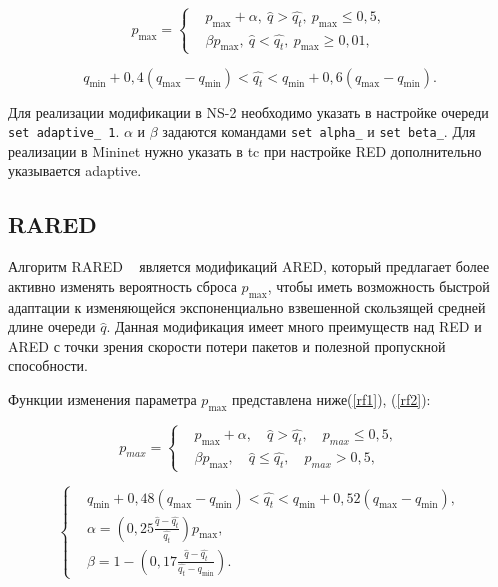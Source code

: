 \begin{equation}
\label{ad1}
p_{\max} = \left\{
  \begin{aligned}
    & p_{\max}+\alpha, \ \hat{q}>\hat{q_{t}}, \ p_{\max} \leqslant 0,5, \\
    & \beta p_{\max}, \ \hat{q}<\hat{q_{t}}, \ p_{\max} \geqslant 0,01, 
  \end{aligned}
\right.
\end{equation}

\begin{equation}
\label{ad2}
q_{\min}+0,4(q_{\max}-q_{\min}) < \hat{q_t} < q_{\min}+0,6\left(q_{\max}-q_{\min}\right).
\end{equation}


Для реализации модификации в NS-2 необходимо указать в
настройке очереди \verb|set adaptive_ 1|. $\alpha$ и $\beta$ задаются командами \verb|set alpha_| и \verb|set beta_|.     
Для реализации в Mininet нужно указать в tc при настройке RED дополнительно указывается adaptive.


\subsection{RARED}

Алгоритм RARED ~\cite{RARED} является модификаций ARED, который предлагает более активно изменять вероятность сброса $p_{\max}$,
чтобы иметь возможность быстрой адаптации к изменяющейся
экспоненциально взвешенной скользящей средней длине очереди $\hat{q}$. Данная модификация имеет много преимуществ 
над RED и ARED с точки зрения скорости потери пакетов и полезной пропускной способности. 

Функции изменения параметра $p_{\max}$ представлена ниже(\eqref{rf1}), (\eqref{rf2}):

\begin{equation}
\label{rf1}
p_{max} = \left\{
  \begin{aligned}
& p_{\max}+\alpha, \quad  \hat{q}>\hat{q_{t}}, \quad p_{max} \leqslant 0,5, \\
& \beta p_{\max}, \quad \hat{q}\leqslant\hat{q_{t}}, \quad p_{max} > 0,5,
  \end{aligned}
\right.
\end{equation}

\begin{equation}
\label{rf2}
\left\{
  \begin{aligned}
    & q_{\min}+0,48\left(q_{\max}-q_{\min}\right) < \hat{q_t} < q_{\min}+0,52\left(q_{\max}-q_{\min}\right), \\
    & \alpha=\left(0,25\frac{\hat{q}-\hat{q_t}}{\hat{q_t}} \right)p_{\max}, \\ 
    & \beta=1-\left(0,17\frac{\hat{q}-\hat{q_t}}{\hat{q_t}-q_{\min}}\right).
  \end{aligned}
\right.
\end{equation}


